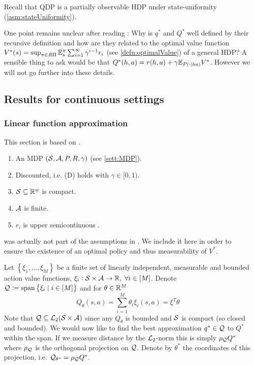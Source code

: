 Recall that QDP is a partially observable HDP under state-uniformity
(\cref{asm:stateUniformity}).

One point remains unclear after reading :
Why is $q^*$ and $Q^*$ well defined by their recursive definition
and how are they related to the optimal value function
$V^*(s) = \sup_{\pi \in R\Pi} \mathbb{E}_s^\pi
\sum_{i=1}^\infty \gamma^{i-1} r_i $
(see \cref{defn:optimalValue})
of a general HDP?
A sensible thing to ask would be that
$Q^*(h, a) = r(h, a) + \gamma \mathbb{E}_{P(\cdot \mid h a)} V^*$.
However we will not go further into these details.

\subsection{Results for continuous settings}

\subsubsection{Linear function approximation}

This section is based on .

\begin{sett}
  \leavevmode
  \begin{enumerate}
    \item An MDP $(\mathcal{S}, \mathcal{A}, P, R, \gamma)$ (see \cref{sett:MDP}).
    \item Discounted, i.e. (D) holds with $\gamma \in [0,1)$.
    \item $\mathcal{S} \subseteq \mathbb{R}^w$ is compact.
    \item $\mathcal{A}$ is finite.
    \item $r_i$ is upper semicontinuous \label{item:MRlast}.
  \end{enumerate}
  \label{sett:MR}
\end{sett}

\begin{rem}
   was actually not part of the assumptions in
  .
  We include it here in order to ensure the existence of an
  optimal policy and thus measurability of $V^*$.
\end{rem}

Let $\left\{ \xi_1, \dots, \xi_M \right\}$ be a finite set of linearly
independent, measurable and bounded action value functions,
$\xi_i : \mathcal{S} \times \mathcal{A} \to \mathbb{R},\; \forall i \in [M]$.
Denote $\mathcal{Q} \vcentcolon= \mathrm{span}\left\{ \xi_i \mid i \in [M] \right\}$
and for $\theta \in \mathbb{R}^M$
\[ Q_\theta(s, a) = \sum_{i=1}^M \theta_i \xi_i(s, a) = \xi^T \theta \]
Note that $\mathcal{Q} \subseteq \mathcal{L}_2(\mathcal{S}\times\mathcal{A})$ since any
$Q_\theta$ is bounded and $\mathcal{S}$ is compact (so closed and bounded).
We would now like to find the best approximation
$q^* \in \mathcal{Q}$ to $Q^*$ within the span.
If we measure distance by the $\mathcal{L}_2$-norm this is
simply $\rho_\mathcal{Q} Q^*$ where $\rho_\mathcal{Q}$ is the orthogonal projection on
$\mathcal{Q}$. Denote by $\theta^*$ the coordinates of this projection, i.e.
$\mathcal{Q}_{\theta^*} = \rho_\mathcal{Q} Q^*$.

